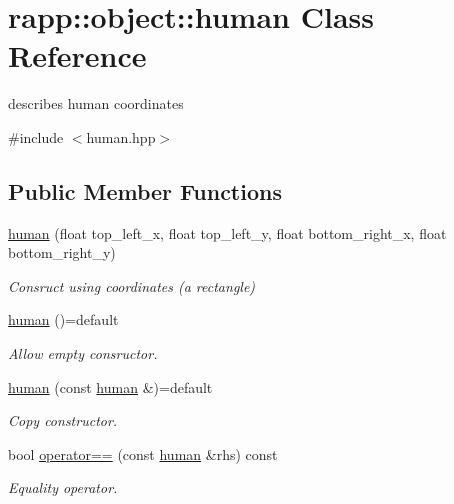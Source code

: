\hypertarget{classrapp_1_1object_1_1human}{\section{rapp\-:\-:object\-:\-:human Class Reference}
\label{classrapp_1_1object_1_1human}
}


describes human coordinates  




{\ttfamily \#include $<$human.\-hpp$>$}

\subsection*{Public Member Functions}
\begin{DoxyCompactItemize}
\item 
\hyperlink{classrapp_1_1object_1_1human_a93d372026e5dd13fe59996e33415804f}{human} (float top\-\_\-left\-\_\-x, float top\-\_\-left\-\_\-y, float bottom\-\_\-right\-\_\-x, float bottom\-\_\-right\-\_\-y)
\begin{DoxyCompactList}\small\item\em Consruct using coordinates (a rectangle) \end{DoxyCompactList}\item 
\hyperlink{classrapp_1_1object_1_1human_a9951473582bf8459498aa7d6b18627ed}{human} ()=default
\begin{DoxyCompactList}\small\item\em Allow empty consructor. \end{DoxyCompactList}\item 
\hyperlink{classrapp_1_1object_1_1human_adb403d70461c9708595c37d0c2915057}{human} (const \hyperlink{classrapp_1_1object_1_1human}{human} \&)=default
\begin{DoxyCompactList}\small\item\em Copy constructor. \end{DoxyCompactList}\item 
bool \hyperlink{classrapp_1_1object_1_1human_a3626d71fd452457763cc3e102808c8a6}{operator==} (const \hyperlink{classrapp_1_1object_1_1human}{human} \&rhs) const 
\begin{DoxyCompactList}\small\item\em Equality operator. \end{DoxyCompactList}\end{DoxyCompactItemize}
